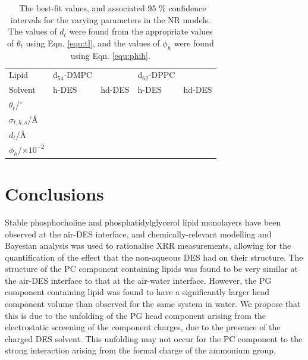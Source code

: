 \documentclass[twoside,twocolumn,9pt]{article}
\begin{document}
\begin{table}
	\small
	\caption{\ The best-fit values, and associated 95 \% confidence intervals for the varying parameters in the NR models. The values of $d_t$ were found from the appropriate values of $\theta_t$ using Eqn. \ref{equ:tl}, and the values of $\phi_h$ were found using Eqn. \ref{equ:phih}.}
	\label{tab:neutron}
	\begin{tabular*}{0.48\textwidth}{@{\extracolsep{\fill}}lllll}
		\hline
		Lipid & d$_{54}$-DMPC & & d$_{62}$-DPPC & \\
		Solvent & h-DES & hd-DES & h-DES & hd-DES \\
		\hline
		$\theta_t$/$^\circ$ &  &  &  &  \\
		$\sigma_{t,h,s}$/\AA &  &  &  &  \\
		\hline
		$d_t$/\AA &  &  &  &  \\ 
		$\phi_h$/$\times10^{-2}$ &  &  &  &  \\
		\hline
	\end{tabular*}
\end{table}

\section{Conclusions}
Stable phosphocholine and phosphatidylglycerol lipid monolayers have been observed at the air-DES interface, and chemically-relevant modelling and Bayesian analysis was used to rationalise XRR measurements, allowing for the quantification of the effect that the non-aqueous DES had on their structure. The structure of the PC component containing lipids was found to be very similar at the air-DES interface to that at the air-water interface. However, the PG component containing lipid was found to have a significantly larger head component volume than observed for the same system in water. We propose that this is due to the unfolding of the PG head component arising from the electrostatic screening of the component charges, due to the presence of the charged DES solvent. This unfolding may not occur for the PC component to the strong interaction arising from the formal charge of the ammonium group. 
\end{document}
